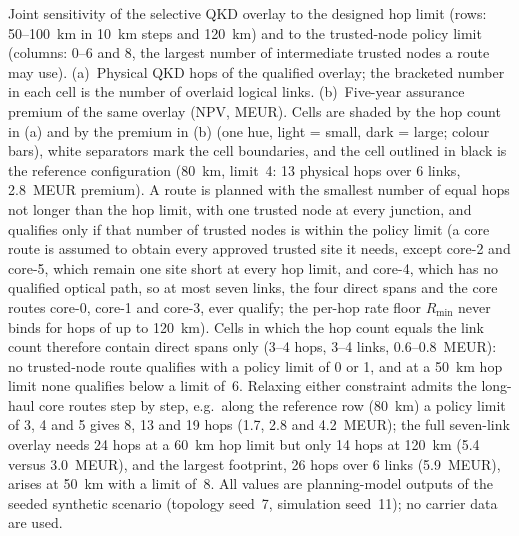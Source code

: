 Joint sensitivity of the selective QKD overlay to the designed hop limit
(rows: 50--100~km in 10~km steps and 120~km) and to the trusted-node policy
limit (columns: 0--6 and 8, the largest number of intermediate trusted nodes
a route may use). (a)~Physical QKD hops of the qualified overlay; the
bracketed number in each cell is the number of overlaid logical links.
(b)~Five-year assurance premium of the same overlay (NPV, MEUR). Cells are
shaded by the hop count in (a) and by the premium in (b) (one hue,
light = small, dark = large; colour bars), white separators mark the cell
boundaries, and the cell outlined in black is the reference configuration
(80~km, limit~4: 13 physical hops over 6 links, 2.8~MEUR premium). A route is
planned with the smallest number of equal hops not longer than the hop limit,
with one trusted node at every junction, and qualifies only if that number of
trusted nodes is within the policy limit (a core route is assumed to obtain
every approved trusted site it needs, except core-2 and core-5, which remain
one site short at every hop limit, and core-4, which has no qualified optical
path, so at most seven links, the four direct spans and the core routes
core-0, core-1 and core-3, ever qualify; the per-hop rate floor $R_{\min}$
never binds for hops of up to 120~km). Cells in which the hop count equals
the link count therefore contain direct spans only (3--4 hops, 3--4 links,
0.6--0.8~MEUR): no trusted-node route qualifies with a policy limit of 0 or 1,
and at a 50~km hop limit none qualifies below a limit of~6. Relaxing either
constraint admits the long-haul core routes step by step, e.g.\ along the
reference row (80~km) a policy limit of 3, 4 and 5 gives 8, 13 and 19 hops
(1.7, 2.8 and 4.2~MEUR); the full seven-link overlay needs 24 hops at a 60~km
hop limit but only 14 hops at 120~km (5.4 versus 3.0~MEUR), and the largest
footprint, 26 hops over 6 links (5.9~MEUR), arises at 50~km with a limit
of~8. All values are planning-model outputs of the seeded synthetic scenario
(topology seed~7, simulation seed~11); no carrier data are used.
